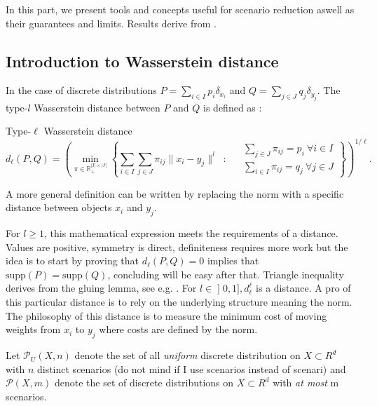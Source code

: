 \documentclass{amsart}
\begin{document}
In this part, we present tools and concepts useful for scenario reduction aswell as their guarantees and limits. Results derive from \cite{rujeerapaiboon_scenario_2022}. 

\subsection{Introduction to Wasserstein distance}
In the case of discrete distributions $P=\sum_{i\in I}p_i\delta_{x_i}$ and $Q=\sum_{j\in J}q_j\delta_{y_j}$. The type-$l$ Wasserstein distance between $P$ and $Q$ is defined as :  
\begin{definition}{Type-$\ell$ Wasserstein distance}
$$
d_\ell(P,Q)=\left(\min_{\pi\in\mathbb{R}_+^{\lvert I\rvert\times\lvert J\rvert}}\left\{ 
\sum_{i\in I}\sum_{j\in J}\pi_{ij}\lVert x_i-y_j\rVert^l \: \text{ : } \:  \begin{aligned}
& \sum_{j\in J}\pi_{ij}=p_i \: \forall i\in I \\
& \sum_{i\in I}\pi_{ij}=q_j \: \forall j\in J
\end{aligned}\right\}\right)^{1/\ell}.
$$
\end{definition}

\begin{remark}
    A more general definition can be written by replacing the norm with a specific distance between objects $x_i$ and $y_j$. 
\end{remark}
For $l\geq1$, this mathematical expression meets the requirements of a distance. Values are positive, symmetry is direct, definiteness requires more work but the idea is to start by proving that $d_\ell\left(P,Q\right)=0$ implies that $\text{supp}\left(P\right)=\text{supp}\left(Q\right)$, concluding will be easy after that. Triangle inequality derives from the gluing lemma, see e.g. \cite[Chapter 1]{peyre_computational_2019}. For $l\in\mathopen{]}0,1\mathclose{]}, d_\ell^\ell$ is a distance. A pro of this particular distance is to rely on the underlying structure meaning the norm. The philosophy of this distance is to measure the minimum cost of moving weights from $x_i$ to $y_j$ where costs are defined by the norm.
\newline

Let $\mathcal{P}_U(X,n)$ denote the set of all \emph{uniform} discrete distribution on $X\subset R^d$ with $n$ distinct scenarios (do not mind if I use scenarios instead of scenari) and $\mathcal{P}(X,m)$ denote the set of discrete distributions on $X\subset R^d$ with \emph{at most} m scenarios. 
\newline
\end{document}
